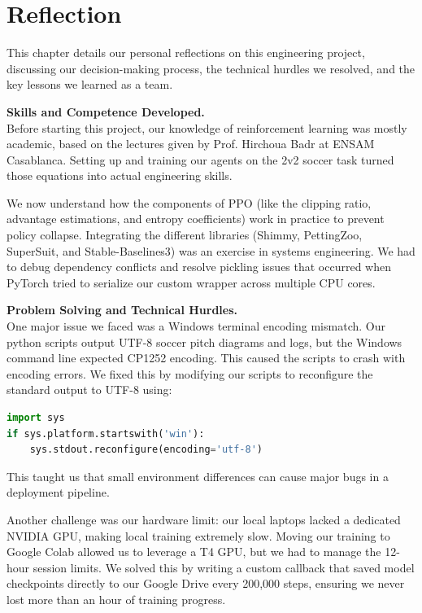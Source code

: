 \chapter{Reflection}
\label{ch:reflection}

This chapter details our personal reflections on this engineering project, discussing our decision-making process, the technical hurdles we resolved, and the key lessons we learned as a team.


\noindent\textbf{Skills and Competence Developed.} \\
Before starting this project, our knowledge of reinforcement learning was mostly academic, based on the lectures given by Prof. Hirchoua Badr at ENSAM Casablanca. Setting up and training our agents on the 2v2 soccer task turned those equations into actual engineering skills. 

We now understand how the components of PPO (like the clipping ratio, advantage estimations, and entropy coefficients) work in practice to prevent policy collapse. Integrating the different libraries (Shimmy, PettingZoo, SuperSuit, and Stable-Baselines3) was an exercise in systems engineering. We had to debug dependency conflicts and resolve pickling issues that occurred when PyTorch tried to serialize our custom wrapper across multiple CPU cores.

\bigskip
\noindent\textbf{Problem Solving and Technical Hurdles.} \\
One major issue we faced was a Windows terminal encoding mismatch. Our python scripts output UTF-8 soccer pitch diagrams and logs, but the Windows command line expected CP1252 encoding. This caused the scripts to crash with encoding errors. We fixed this by modifying our scripts to reconfigure the standard output to UTF-8 using:
\begin{lstlisting}[language=Python]
import sys
if sys.platform.startswith('win'):
    sys.stdout.reconfigure(encoding='utf-8')
\end{lstlisting}
This taught us that small environment differences can cause major bugs in a deployment pipeline. 

Another challenge was our hardware limit: our local laptops lacked a dedicated NVIDIA GPU, making local training extremely slow. Moving our training to Google Colab allowed us to leverage a T4 GPU, but we had to manage the 12-hour session limits. We solved this by writing a custom callback that saved model checkpoints directly to our Google Drive every 200,000 steps, ensuring we never lost more than an hour of training progress.

